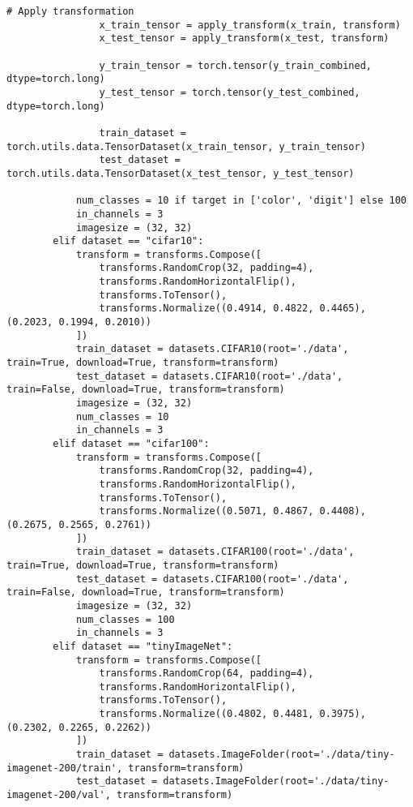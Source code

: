\begin{lstlisting}[style=pythonstyle, caption={メインコード}]
                # Apply transformation
                x_train_tensor = apply_transform(x_train, transform)
                x_test_tensor = apply_transform(x_test, transform)
                
                y_train_tensor = torch.tensor(y_train_combined, dtype=torch.long)
                y_test_tensor = torch.tensor(y_test_combined, dtype=torch.long)
                
                train_dataset = torch.utils.data.TensorDataset(x_train_tensor, y_train_tensor)
                test_dataset = torch.utils.data.TensorDataset(x_test_tensor, y_test_tensor)
        
            num_classes = 10 if target in ['color', 'digit'] else 100
            in_channels = 3
            imagesize = (32, 32)
        elif dataset == "cifar10":
            transform = transforms.Compose([
                transforms.RandomCrop(32, padding=4),
                transforms.RandomHorizontalFlip(),
                transforms.ToTensor(),
                transforms.Normalize((0.4914, 0.4822, 0.4465), (0.2023, 0.1994, 0.2010))
            ])
            train_dataset = datasets.CIFAR10(root='./data', train=True, download=True, transform=transform)
            test_dataset = datasets.CIFAR10(root='./data', train=False, download=True, transform=transform)
            imagesize = (32, 32)
            num_classes = 10
            in_channels = 3
        elif dataset == "cifar100":
            transform = transforms.Compose([
                transforms.RandomCrop(32, padding=4),
                transforms.RandomHorizontalFlip(),
                transforms.ToTensor(),
                transforms.Normalize((0.5071, 0.4867, 0.4408), (0.2675, 0.2565, 0.2761))
            ])
            train_dataset = datasets.CIFAR100(root='./data', train=True, download=True, transform=transform)
            test_dataset = datasets.CIFAR100(root='./data', train=False, download=True, transform=transform)
            imagesize = (32, 32)
            num_classes = 100
            in_channels = 3
        elif dataset == "tinyImageNet":
            transform = transforms.Compose([
                transforms.RandomCrop(64, padding=4),
                transforms.RandomHorizontalFlip(),
                transforms.ToTensor(),
                transforms.Normalize((0.4802, 0.4481, 0.3975), (0.2302, 0.2265, 0.2262))
            ])
            train_dataset = datasets.ImageFolder(root='./data/tiny-imagenet-200/train', transform=transform)
            test_dataset = datasets.ImageFolder(root='./data/tiny-imagenet-200/val', transform=transform)

\end{lstlisting}
